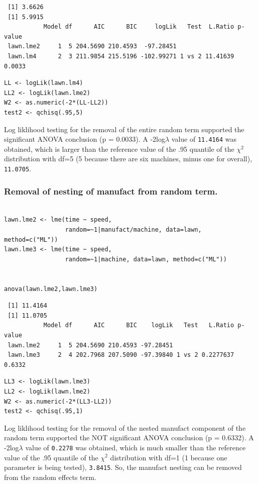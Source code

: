 \documentclass[11pt]{article}
\begin{document}
\begin{verbatim}
 [1] 3.6626
 [1] 5.9915
           Model df      AIC      BIC     logLik   Test  L.Ratio p-value
 lawn.lme2     1  5 204.5690 210.4593  -97.28451                        
 lawn.lm4      2  3 211.9854 215.5196 -102.99271 1 vs 2 11.41639  0.0033
\end{verbatim}


\begin{verbatim}
LL <- logLik(lawn.lm4)
LL2 <- logLik(lawn.lme2)
W2 <- as.numeric(-2*(LL-LL2))
test2 <- qchisq(.95,5)
\end{verbatim}

Log liklihood testing for the removal of the entire random term
supported the significant ANOVA conclusion (p = 0.0033). A
-2log$\lambda$ value of \texttt{11.4164} was obtained, which is 
larger than the reference value of  the .95 quantile of the $\chi$$^2$
distribution with df=5 (5 because there are six machines, minus one
for overall), \texttt{11.0705}.
\subsubsection{Removal of nesting of manufact from random term.}
\label{sec-2-3-2}



\begin{verbatim}

lawn.lme2 <- lme(time ~ speed, 
                 random=~1|manufact/machine, data=lawn, method=c("ML"))  
lawn.lme3 <- lme(time ~ speed, 
                 random=~1|machine, data=lawn, method=c("ML"))  


anova(lawn.lme2,lawn.lme3)
\end{verbatim}

\begin{verbatim}
 [1] 11.4164
 [1] 11.0705
           Model df      AIC      BIC    logLik   Test   L.Ratio p-value
 lawn.lme2     1  5 204.5690 210.4593 -97.28451                         
 lawn.lme3     2  4 202.7968 207.5090 -97.39840 1 vs 2 0.2277637  0.6332
\end{verbatim}


\begin{verbatim}
LL3 <- logLik(lawn.lme3)
LL2 <- logLik(lawn.lme2)
W2 <- as.numeric(-2*(LL3-LL2))
test2 <- qchisq(.95,1)
\end{verbatim}

Log liklihood testing for the removal of the nested manufact component
of the random term
supported the NOT significant ANOVA conclusion (p = 0.6332). A
-2log$\lambda$ value of \texttt{0.2278} was obtained,
which is much smaller than the reference value of  the .95 quantile 
of the $\chi$$^2$ distribution with df=1 
(1 because one parameter is being tested), 
\texttt{3.8415}. So, the manufact nesting can be
removed from the random effects term.
\end{document}
